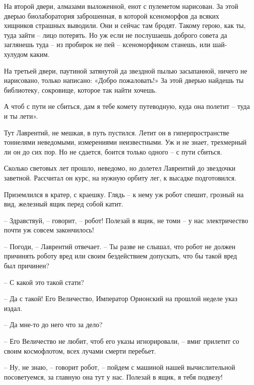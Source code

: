 \documentclass[ebook,oneside,final,openright]{memoir}
\begin{document}
\par
На второй двери, алмазами выложенной, енот с пулеметом нарисован. За этой дверью биолаборатория заброшенная, в которой ксеноморфов да всяких хищников страшных выводили. Они и сейчас там бродят. Такому герою, как ты, туда зайти – лицо потерять. Но уж если не послушаешь доброго совета да заглянешь туда – из пробирок не пей – ксеноморфиком станешь, или шай-хулудом каким.\par
\par
На третьей двери, паутиной затянутой да звездной пылью засыпанной, ничего не нарисовано, только написано: «Добро пожаловать!» За этой дверью найдешь ты библиотеку, сокровище, которое так найти хочешь.\par
\par
А чтоб с пути не сбиться, дам я тебе комету путеводную, куда она полетит – туда и ты лети».\par
\par
Тут Лаврентий, не мешкая, в путь пустился. Летит он в гиперпространстве тоннелями неведомыми, измерениями неизвестными. Уж и не знает, трехмерный ли он до сих пор. Но не сдается, боится только одного – с пути сбиться.\par
\par
Сколько световых лет прошло, неведомо, но долетел Лаврентий до звездочки заветной. Рассчитал он курс, на нужную орбиту лег, к высадке подготовился.\par
\par
Приземлился в кратер, с краешку. Глядь – к нему уж робот спешит, грозный на вид, железный ящик перед собой катит.\par
– Здравствуй, – говорит, – робот! Полезай в ящик, не томи – у нас электричество почти уж совсем закончилось!\par
– Погоди, – Лаврентий отвечает. – Ты разве не слышал, что робот не должен причинять роботу вред или своим бездействием допускать, что бы такой вред был причинен?\par
– С какой это такой стати?\par
– Да с такой! Его Величество, Император Орионский на прошлой неделе указ издал.\par
– Да мне-то до него что за дело?\par
– Его Величество не любит, чтоб его указы игнорировали, – вмиг прилетит со своим космофлотом, всех лучами смерти перебьет.\par
– Ну, не знаю, – говорит робот, – пойдем с машиной нашей вычислительной посоветуемся, за главную она тут у нас. Полезай в ящик, я тебя подвезу!\par
\end{document}
